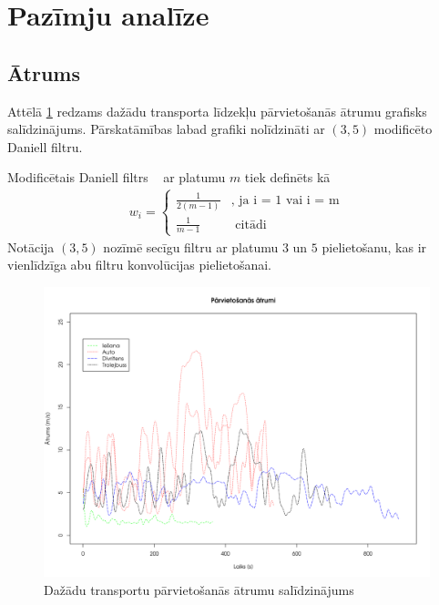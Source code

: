 \documentclass{ludis}
\begin{document}
\section{Pazīmju analīze}
\subsection{Ātrums}
Attēlā \ref{fig:speed_comparison} redzams dažādu transporta līdzekļu pārvietošanās ātrumu grafisks
salīdzinājums. Pārskatāmības labad grafiki nolīdzināti ar $(3, 5)$ modificēto Daniell filtru.

Modificētais Daniell filtrs ~\cite{daniell1946} ar platumu $m$ tiek definēts kā 
\begin{align*}
  w_i = \begin{cases}
    \frac{1}{2 (m - 1)} &\text{, ja i = 1 vai i = m}\\
    \frac{1}{m - 1} &\text{ citādi}
    \end{cases}
\end{align*}
Notācija $(3, 5)$ nozīmē secīgu filtru ar platumu $3$ un $5$ pielietošanu, kas ir vienlīdzīga
abu filtru konvolūcijas pielietošanai.

\begin{figure}
  \centering
  \includegraphics[scale=0.5]{img/speed_comparison}
  \caption{Dažādu transportu pārvietošanās ātrumu salīdzinājums}
  \label{fig:speed_comparison}
\end{figure}
\end{document}
